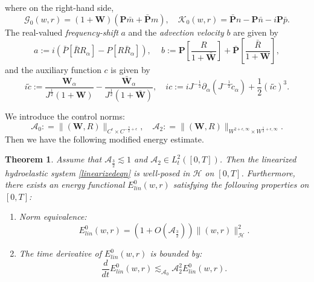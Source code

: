 \documentclass[12pt]{amsart}
\newtheorem{theorem}{Theorem}[section]
\theoremstyle{remark}
\theoremstyle{definition}
\numberwithin{equation}{section}
\newcommand{\p}{\partial}
\renewcommand{\H}{{\mathcal H }}
\newcommand{\al}{\alpha}
\newcommand{\f}{\frac}
\newcommand{\bw}{\mathbf{W}}
\newcommand{\nP}{{\mathbf P}}
\newcommand{\CalAZ}{{\mathcal{A}_0}}
\begin{document}
where on the right-hand side,
\begin{equation*}
\mathcal{G}_0(w,r)=(1+\mathbf{W})(\nP\bar{m}+\bar{\nP}m),\quad
\mathcal{K}_0(w,r)=\bar{\nP}n-\nP\bar{n}-i\nP\bar{p}.
\end{equation*}
The real-valued \textit{frequency-shift} $a$ and the \textit{advection velocity} $b$ are given by
\begin{equation}\label{HF17}
		a:=i\left(\bar{P}[\bar{R}R_{\al}]-P[R\bar{R}_{\al}]\right),\, \quad b:= \nP\left[ \frac{R}{1+\bar{\bw}}\right] + \bar{\nP}\left[ \frac{\bar{R}}{1+\bw}\right],
\end{equation}
and the auxiliary function $c$ is given by
\begin{equation*}
i\tilde{c}:=\f{\mathbf{W}_{\al}}{J^{\f12}(1+\mathbf{W})}
-\f{\bar{\mathbf{W}}_{\al}}{J^{\f12}(1+\bar{\mathbf{W}})}, \quad
ic:=iJ^{-\f12} \p_\al(J^{-\f12}\tilde{c}_\al)+\f12(i\tilde{c})^3.
\end{equation*}

We introduce the control norms:
\begin{equation}\label{D:A74}
\mathcal{A}_0 : = \|(\bw, R) \|_{C^{\epsilon}\times C^{- \f32+\epsilon}}, \quad \mathcal{A}_{2} : = \|(\bw, R) \|_{W^{2+\epsilon, \infty}\times W^{\f12+\epsilon,\infty}}.
\end{equation}
Then we have the following modified energy estimate.
\begin{theorem}
\label{t:Hswellposedflow}
Assume that $\mathcal{A}_\f32 \lesssim 1$ and $\mathcal{A}_{2} \in L^2_t([0,T])$.
Then the linearized hydroelastic system \eqref{linearizedeqn} is well-posed in $\H$ on $[0,T]$.
Furthermore, there exists an energy functional $E^{0}_{lin}(w,r)$ satisfying the following properties on $[0,T]$:
\begin{enumerate}
    \item Norm equivalence:
    \begin{equation*}
        E^{0}_{lin}(w,r) = \left(1+O\left(\mathcal{A}_\f32 \right) \right) \| (w,r)\|^2_{\H}.
    \end{equation*}
    \item The time derivative of $E_{lin}^{0}(w,r)$ is bounded by:
    \begin{equation*}
        \frac{d}{dt} E_{lin}^{0}(w,r) \lesssim_{\CalAZ}  \mathcal{A}_{2}^2 E^{0}_{lin}(w,r).
    \end{equation*}
\end{enumerate} 
\end{theorem} 
\end{document}
